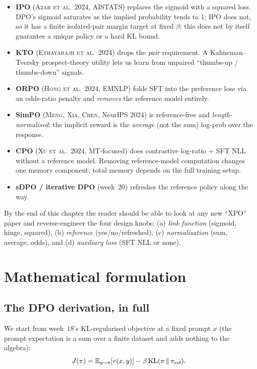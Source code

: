 \documentclass[11pt,oneside]{scrbook}
\begin{document}
\begin{itemize}[leftmargin=*]
  \item \textbf{IPO} (\textsc{Azar et al.\ 2024}, AISTATS) replaces
        the sigmoid with a squared loss. DPO's sigmoid saturates as
        the implied probability tends to 1; IPO does not, so it
        has a finite isolated-pair margin target at fixed $\beta$; this does not by itself guarantee a unique policy or a hard KL bound.
  \item \textbf{KTO} (\textsc{Ethayarajh et al.\ 2024}) drops the
        \emph{pair} requirement. A Kahneman--Tversky prospect-theory
        utility lets us learn from unpaired ``thumbs-up / thumbs-down''
        signals.
  \item \textbf{ORPO} (\textsc{Hong et al.\ 2024}, EMNLP) folds SFT
        into the preference loss via an odds-ratio penalty and
        \emph{removes} the reference model entirely.
  \item \textbf{SimPO} (\textsc{Meng, Xia, Chen}, NeurIPS 2024)
        is reference-free and \emph{length-normalised}: the implicit
        reward is the \emph{average} (not the sum) log-prob over the
        response.
  \item \textbf{CPO} (\textsc{Xu et al.\ 2024}, MT-focused) does
        contrastive log-ratio + SFT NLL without a reference model.
        Removing reference-model computation changes one memory component; total memory depends on the full training setup.
  \item \textbf{sDPO / iterative DPO} (week~20) refreshes the
        reference policy along the way.
\end{itemize}

By the end of this chapter the reader should be able to look at any
new ``XPO'' paper and reverse-engineer the four design knobs:
(a) \emph{link function} (sigmoid, hinge, squared), (b) \emph{reference}
(yes/no/refreshed), (c) \emph{normalisation} (sum, average, odds),
and (d) \emph{auxiliary loss} (SFT NLL or none).

\chapter{Mathematical formulation}

\section{The DPO derivation, in full}

We start from week~18's KL-regularised objective at a fixed prompt
$x$ (the prompt expectation is a sum over a finite dataset and adds
nothing to the algebra):
\begin{equation}
J(\pi) = \mathbb{E}_{y \sim \pi}[r(x, y)] - \beta\, \mathrm{KL}(\pi \,\|\, \pi_{\text{ref}}).
\label{eq:obj}
\end{equation}
\end{document}

